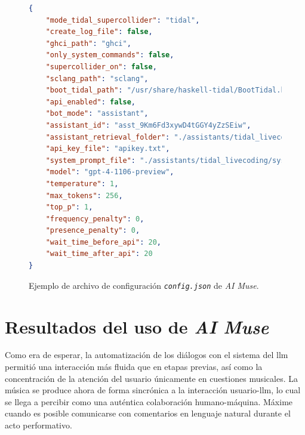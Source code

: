 \begin{figure}[H]
    \caption[Ejemplo de archivo de configuración \texttt{config.json} de \emph{AI Muse}]{Ejemplo de archivo de configuración \texttt{\emph{config.json}} de \emph{AI Muse}.}
    \centering
\begin{lstlisting}[language=json, numbers=none]
{
    "mode_tidal_supercollider": "tidal",
    "create_log_file": false,
    "ghci_path": "ghci",
    "only_system_commands": false,
    "supercollider_on": false,
    "sclang_path": "sclang",
    "boot_tidal_path": "/usr/share/haskell-tidal/BootTidal.hs",
    "api_enabled": false,
    "bot_mode": "assistant",
    "assistant_id": "asst_9Km6Fd3xywD4tGGY4yZzSEiw",
    "assistant_retrieval_folder": "./assistants/tidal_livecoding/retrieval_files/",
    "api_key_file": "apikey.txt",
    "system_prompt_file": "./assistants/tidal_livecoding/system_prompts/system_prompt_01",
    "model": "gpt-4-1106-preview",
    "temperature": 1,
    "max_tokens": 256,
    "top_p": 1,
    "frequency_penalty": 0,
    "presence_penalty": 0,
    "wait_time_before_api": 20,
    "wait_time_after_api": 20
}
\end{lstlisting}
    \source{\propio}
    \label{fig:json}
\end{figure}





\section{Resultados del uso de \emph{AI Muse}}

Como era de esperar, la automatización de los diálogos con el sistema del \gls{llm} permitió una interacción más fluida que en etapas previas, así como la concentración de la atención del usuario únicamente en cuestiones musicales. La música se produce ahora de forma sincrónica a la interacción usuario-\gls{llm}, lo cual se llega a percibir como una auténtica colaboración humano-máquina. Máxime cuando es posible comunicarse con comentarios en lenguaje natural durante el acto performativo.

